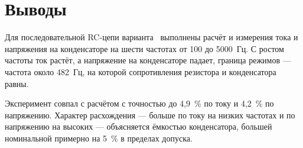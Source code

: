 \section{Выводы}
Для последовательной RC-цепи варианта~\bbtVariant{} выполнены расчёт и измерения тока и напряжения на
конденсаторе на шести частотах от 100 до 5000~Гц. С ростом частоты ток растёт, а напряжение
на конденсаторе падает, граница режимов — частота около 482~Гц, на которой сопротивления
резистора и конденсатора равны.

Эксперимент совпал с расчётом с точностью до 4,9~\% по току и 4,2~\% по напряжению.
Характер расхождения — больше по току на низких частотах и по напряжению на высоких —
объясняется ёмкостью конденсатора, большей номинальной примерно на 5~\% в пределах допуска.
